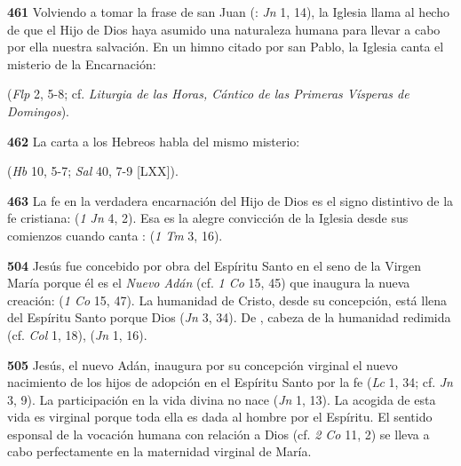 \begin{body}
\begin{body}
\textbf{461} Volviendo a tomar la frase de san Juan (: \emph{Jn} 1, 14), la Iglesia llama  al hecho de que el Hijo de Dios haya asumido una naturaleza humana para llevar a cabo por ella nuestra salvación. En un himno citado por san Pablo, la Iglesia canta el misterio de la Encarnación:

 (\emph{Flp} 2, 5-8; cf. \emph{Liturgia de las Horas, Cántico de las Primeras Vísperas de Domingos}).

\textbf{462} La carta a los Hebreos habla del mismo misterio:

 (\emph{Hb} 10, 5-7; \emph{Sal} 40, 7-9 {[}LXX{]}).

\textbf{463} La fe en la verdadera encarnación del Hijo de Dios es el signo distintivo de la fe cristiana:  (\emph{1 Jn} 4, 2). Esa es la alegre convicción de la Iglesia desde sus comienzos cuando canta :  (\emph{1 Tm} 3, 16).

\textbf{504} Jesús fue concebido por obra del Espíritu Santo en el seno de la Virgen María porque él es el \emph{Nuevo Adán} (cf. \emph{1 Co} 15, 45) que inaugura la nueva creación:  (\emph{1 Co} 15, 47). La humanidad de Cristo, desde su concepción, está llena del Espíritu Santo porque Dios  (\emph{Jn} 3, 34). De , cabeza de la humanidad redimida (cf. \emph{Col} 1, 18),  (\emph{Jn} 1, 16).

\textbf{505} Jesús, el nuevo Adán, inaugura por su concepción virginal el nuevo nacimiento de los hijos de adopción en el Espíritu Santo por la fe  (\emph{Lc} 1, 34; cf. \emph{Jn} 3, 9). La participación en la vida divina no nace  (\emph{Jn} 1, 13). La acogida de esta vida es virginal porque toda ella es dada al hombre por el Espíritu. El sentido esponsal de la vocación humana con relación a Dios (cf. \emph{2 Co} 11, 2) se lleva a cabo perfectamente en la maternidad virginal de María.


\end{body}
\end{body}
